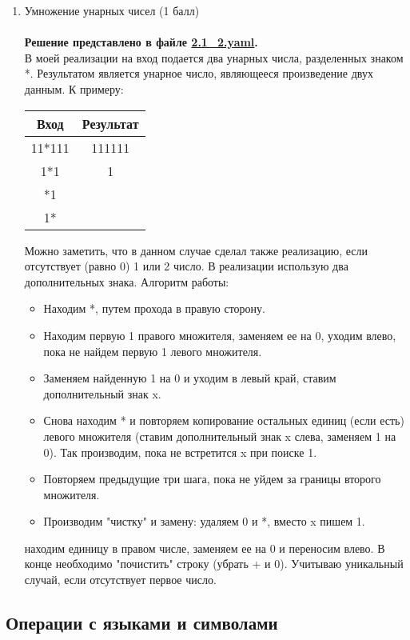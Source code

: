\documentclass{article}
\begin{document}
\begin{enumerate}
    \item Умножение унарных чисел (1 балл) \\ \\
    \textbf{Решение представлено в файле \href{https://github.com/NRU-MPEI-IMAI/tm-and-qc-s3tout/blob/main/TMV3/2.1_2.yaml}{2.1\_2.yaml}.} \\
    В моей реализации на вход подается два унарных числа, разделенных знаком *. Результатом является унарное число, являющееся произведение двух данным. 
    К примеру: 
    \begin{center}
        \begin{tabular}{c|c}
        Вход    & Результат     \\ \hline
        11*111  & 111111        \\
        1*1     & 1             \\
        *1      &               \\
        1*      &  
    \end{tabular}
    \end{center}
    Можно заметить, что в данном случае сделал также реализацию, если отсутствует (равно 0) 1 или 2 число. В реализации использую два дополнительных знака. Алгоритм работы:
    \begin{itemize}
         \item Находим *, путем прохода в правую сторону.
        \item Находим первую 1 правого множителя, заменяем ее на 0, уходим влево, пока не найдем первую 1 левого множителя.
        \item Заменяем найденную 1 на 0 и уходим в левый край, ставим дополнительный знак x.
        \item Снова находим * и повторяем копирование остальных единиц (если есть) левого множителя (ставим дополнительный знак x слева, заменяем 1 на 0). Так производим, пока не встретится x при поиске 1. 
        \item Повторяем предыдущие три шага, пока не уйдем за границы второго множителя. 
        \item Производим "чистку" и замену: удаляем 0 и *, вместо x пишем 1. 
    \end{itemize}
    находим единицу в правом числе, заменяем ее на 0 и переносим влево. В конце необходимо "почистить" строку (убрать + и 0). Учитываю уникальный случай, если отсутствует первое число. 
\end{enumerate}

\subsection{Операции с языками и символами}
\end{document}

